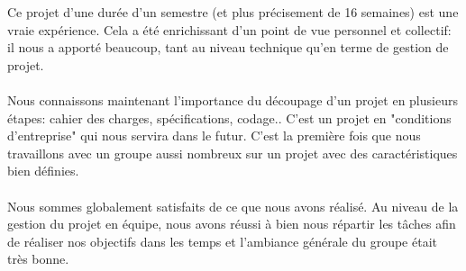 \documentclass[a4]{article}
\begin{document}
Ce projet d'une durée d'un semestre (et plus précisement de 16 semaines) est une vraie expérience.
Cela a été enrichissant d'un point de vue personnel et collectif:
il nous a apporté beaucoup, tant au
niveau technique qu’en terme de gestion de projet.  \\  \\
Nous connaissons maintenant l'importance du découpage d'un projet en plusieurs étapes: cahier des charges, spécifications, codage..
C'est un projet en "conditions d'entreprise" qui nous servira dans le futur.
C’est la première fois que nous travaillons avec un groupe aussi nombreux sur un projet avec des caractéristiques bien définies. \\ \\
Nous sommes globalement satisfaits de ce que nous avons réalisé.
Au niveau de la gestion du projet en équipe, nous avons réussi à bien nous répartir les
tâches afin de réaliser nos objectifs dans les temps et l'ambiance générale du groupe était très bonne. \\ \\ \\


	
\end{document}
